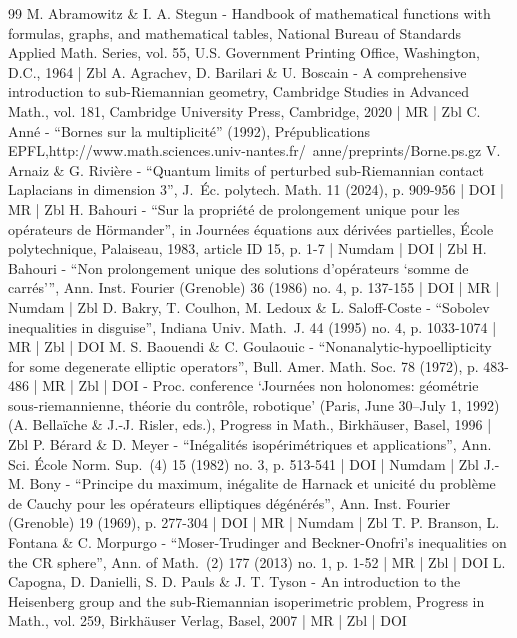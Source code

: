 \documentclass[10pt]{amsart}
\theoremstyle{definition}
\newcommand{\1}{\mathbbm{1}}
\begin{document}
\begin{thebibliography}{99}
M. Abramowitz \& I. A. Stegun - Handbook of mathematical functions with formulas, graphs, and mathematical tables, National Bureau of Standards Applied Math. Series, vol. 55, U.S. Government Printing Office, Washington, D.C., 1964 | Zbl
A. Agrachev, D. Barilari \& U. Boscain - A comprehensive introduction to sub-Riemannian geometry, Cambridge Studies in Advanced Math., vol. 181, Cambridge University Press, Cambridge, 2020 | MR | Zbl
C. Anné - “Bornes sur la multiplicité” (1992), Prépublications EPFL,http://www.math.sciences.univ-nantes.fr/~anne/preprints/Borne.ps.gz
V. Arnaiz \& G. Rivière - “Quantum limits of perturbed sub-Riemannian contact Laplacians in dimension 3”, J. Éc. polytech. Math. 11 (2024), p. 909-956 | DOI | MR | Zbl
H. Bahouri - “Sur la propriété de prolongement unique pour les opérateurs de Hörmander”, in Journées équations aux dérivées partielles, École polytechnique, Palaiseau, 1983, article ID 15, p. 1-7 | Numdam | DOI | Zbl
H. Bahouri - “Non prolongement unique des solutions d’opérateurs ‘somme de carrés’”, Ann. Inst. Fourier (Grenoble) 36 (1986) no. 4, p. 137-155 | DOI | MR | Numdam | Zbl
D. Bakry, T. Coulhon, M. Ledoux \& L. Saloff-Coste - “Sobolev inequalities in disguise”, Indiana Univ. Math. J. 44 (1995) no. 4, p. 1033-1074 | MR | Zbl | DOI
M. S. Baouendi \& C. Goulaouic - “Nonanalytic-hypoellipticity for some degenerate elliptic operators”, Bull. Amer. Math. Soc. 78 (1972), p. 483-486 | MR | Zbl | DOI
- Proc. conference ‘Journées non holonomes: géométrie sous-riemannienne, théorie du contrôle, robotique’ (Paris, June 30–July 1, 1992) (A. Bellaïche \& J.-J. Risler, eds.), Progress in Math., Birkhäuser, Basel, 1996 | Zbl
P. Bérard \& D. Meyer - “Inégalités isopérimétriques et applications”, Ann. Sci. École Norm. Sup. (4) 15 (1982) no. 3, p. 513-541 | DOI | Numdam | Zbl
J.-M. Bony - “Principe du maximum, inégalite de Harnack et unicité du problème de Cauchy pour les opérateurs elliptiques dégénérés”, Ann. Inst. Fourier (Grenoble) 19 (1969), p. 277-304 | DOI | MR | Numdam | Zbl
T. P. Branson, L. Fontana \& C. Morpurgo - “Moser-Trudinger and Beckner-Onofri’s inequalities on the CR sphere”, Ann. of Math. (2) 177 (2013) no. 1, p. 1-52 | MR | Zbl | DOI
L. Capogna, D. Danielli, S. D. Pauls \& J. T. Tyson - An introduction to the Heisenberg group and the sub-Riemannian isoperimetric problem, Progress in Math., vol. 259, Birkhäuser Verlag, Basel, 2007 | MR | Zbl | DOI

\end{thebibliography}
\end{document}
